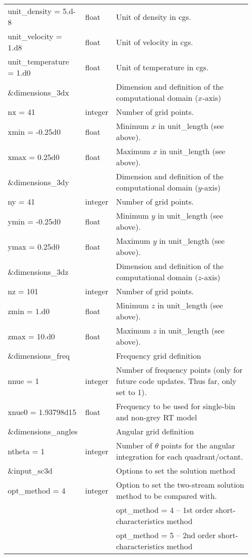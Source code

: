 \documentclass[10pt,a4paper]{article}
\begin{document}
\begin{footnotesize}
\begin{longtable}[h]{p{0.24\linewidth}p{0.07\linewidth}p{0.69\linewidth}}
unit\_density = 5.d-8 & float & Unit of density in cgs.\\
unit\_velocity = 1.d8 & float & Unit of velocity in cgs.\\
unit\_temperature = 1.d0 & float & Unit of temperature in cgs.\\\hline
%
\&dimensions\_3dx & & Dimension and definition of the computational domain ($x$-axis) \\
nx = 41 & integer & Number of grid points. \\
xmin = -0.25d0 & float & Minimum $x$ in unit\_length (see above). \\
xmax = 0.25d0 & float & Maximum  $x$ in unit\_length (see above). \\\hline
%
\&dimensions\_3dy & & Dimension and definition of the computational domain ($y$-axis) \\
ny = 41 & integer & Number of grid points. \\
ymin = -0.25d0 & float & Minimum $y$ in unit\_length (see above). \\
ymax = 0.25d0 & float & Maximum  $y$ in unit\_length (see above). \\\hline
%
\&dimensions\_3dz & & Dimension and definition of the computational domain ($z$-axis) \\
nz = 101 & integer & Number of grid points. \\
zmin = 1.d0 & float & Minimum $z$ in unit\_length (see above). \\
zmax = 10.d0 & float & Maximum  $z$ in unit\_length (see above). \\\hline
%
\&dimensions\_freq & & Frequency grid definition \\
nnue = 1 & integer & Number of frequency points (only for future code updates. Thus far, only set to 1). \\
xnue0 = 1.93798d15 & float & Frequency to be used for single-bin and non-grey RT model \\\hline
%
\&dimensions\_angles & & Angular grid definition \\
ntheta = 1 & integer & Number of $\theta$ points for the angular integration for each quadrant/octant. \\\hline
%
\&input\_sc3d & & Options to set the solution method \\
opt\_method = 4 & integer & Option to set the two-stream solution method to be compared with. \\
& & opt\_method = 4 -- 1st order short-characteristics method \\
& & opt\_method = 5 -- 2nd order short-characteristics method \\

\end{longtable}
\end{footnotesize}
\end{document}
